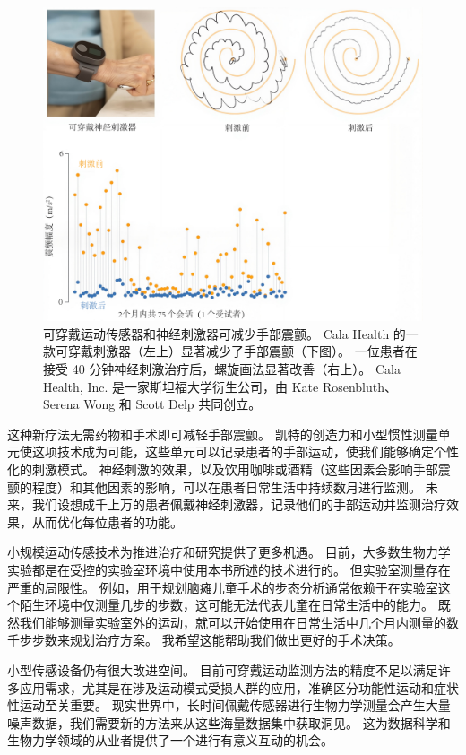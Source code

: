 \begin{figure}[!htb]
	\centering
	\includegraphics[width=1.0\linewidth]{chap13/13_1}
	\caption{可穿戴运动传感器和神经刺激器可减少手部震颤。
		Cala Health 的一款可穿戴刺激器（左上）显著减少了手部震颤（下图）。
		一位患者在接受 40 分钟神经刺激治疗后，螺旋画法显著改善（右上）。
		Cala Health, Inc. 是一家斯坦福大学衍生公司，由 Kate Rosenbluth、Serena Wong 和 Scott Delp 共同创立。 \label{fig:13_1}}
\end{figure}


这种新疗法无需药物和手术即可减轻手部震颤。
凯特的创造力和小型惯性测量单元使这项技术成为可能，这些单元可以记录患者的手部运动，使我们能够确定个性化的刺激模式。
神经刺激的效果，以及饮用咖啡或酒精（这些因素会影响手部震颤的程度）和其他因素的影响，可以在患者日常生活中持续数月进行监测。
未来，我们设想成千上万的患者佩戴神经刺激器，记录他们的手部运动并监测治疗效果，从而优化每位患者的功能。


小规模运动传感技术为推进治疗和研究提供了更多机遇。
目前，大多数生物力学实验都是在受控的实验室环境中使用本书所述的技术进行的。
但实验室测量存在严重的局限性。
例如，用于规划脑瘫儿童手术的步态分析通常依赖于在实验室这个陌生环境中仅测量几步的步数，这可能无法代表儿童在日常生活中的能力。
既然我们能够测量实验室外的运动，就可以开始使用在日常生活中几个月内测量的数千步步数来规划治疗方案。
我希望这能帮助我们做出更好的手术决策。


小型传感设备仍有很大改进空间。
目前可穿戴运动监测方法的精度不足以满足许多应用需求，尤其是在涉及运动模式受损人群的应用，准确区分功能性运动和症状性运动至关重要。
现实世界中，长时间佩戴传感器进行生物力学测量会产生大量噪声数据，我们需要新的方法来从这些海量数据集中获取洞见。
这为数据科学和生物力学领域的从业者提供了一个进行有意义互动的机会。


